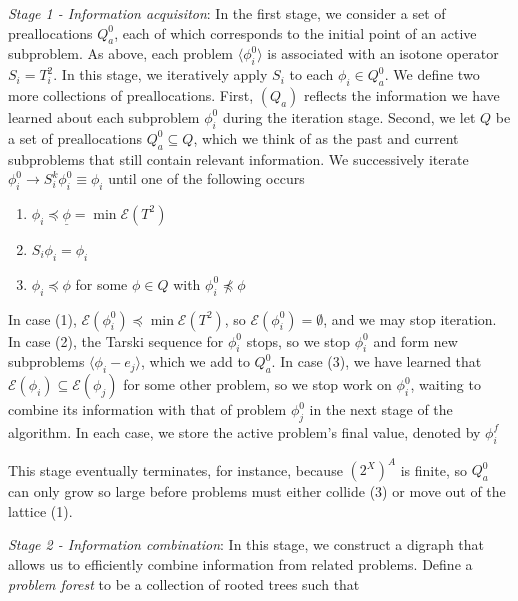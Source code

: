\documentclass[11pt,reqno]{amsart}
\theoremstyle{definition}
\numberwithin{equation}{section}
\newcommand{\ul}{\underline}
\newcommand{\lag}{\langle}
\newcommand{\rag}{\rangle}
\newcommand{\pre}{\phi}
\newcommand{\prealloc}{(2^X)^A}
\newcommand{\sub}{\subseteq}
\newcommand{\fix}{\mathcal{E}}
\newcommand{\peq}{\preceq}
\newcommand{\acto}{Q_a^{0}}
\newcommand{\act}{(Q_a)}
\newcommand{\preo}{\pre^{0}}
\newcommand{\pref}{\pre^{f}}
\begin{document}
\emph{Stage 1 - Information acquisiton}: In the first stage, we consider a set of preallocations $\acto$, each of which corresponds to the initial point of an active subproblem. 
As above, each problem $\lag \preo_i \rag$ is associated with an isotone operator $S_i = T_i^2$.
In this stage, we iteratively apply $S_i$ to each $\pre_i \in \acto$.
We define two more collections of preallocations.
First, $\act$ reflects the information we have learned about each subproblem $\preo_i$ during the iteration stage.  
Second, we let $Q$ be a set of preallocations $\acto \sub Q$, which we think of as the past and current subproblems that still contain relevant information.  
We successively iterate $\preo_i \to S_i^k \preo_i \equiv \pre_i$ until one of the following occurs 
\begin{enumerate}
\item $\pre_i \peq \ul{\pre} = \min \fix(T^2)$ 
\item $S_i \pre_i = \pre_i$
\item $\pre_i \peq \pre$ for some $\pre \in Q$ with $\preo_i \not \peq \pre$ 
\end{enumerate} 

In case (1), $\fix(\preo_i) \peq \min \fix(T^2)$, so $\fix(\preo_i) = \emptyset$, and we may stop iteration. 
In case (2), the Tarski sequence for $\preo_i$ stops, so we stop $\preo_i$ and form new subproblems $\lag \pre_i - e_j \rag$, which we add to $\acto$.  
In case (3), we have learned that $\fix(\pre_i) \sub \fix(\pre_j)$ for some other problem, so we stop work on $\preo_i$, waiting to combine its information with that of problem $\preo_j$ in the next stage of the algorithm.  In each case, we store the active problem's final value, denoted by $\pref_i$

This stage eventually terminates, for instance, because $\prealloc$ is finite, so $\acto$ can only grow so large before problems must either collide (3) or move out of the lattice (1).

\emph{Stage 2 - Information combination}: In this stage, we construct a digraph that allows us to efficiently combine information from related problems.
Define a \emph{problem forest} to be a collection of rooted trees such that 
\end{document}

